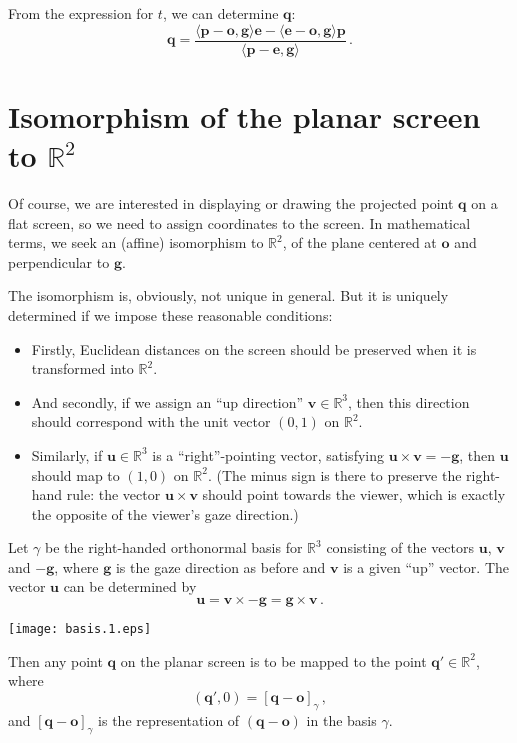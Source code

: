 \documentclass[12pt]{article}
\newcommand{\real}{\mathbb{R}}
\providecommand{\pe}{\mathbf{e}}
\providecommand{\vg}{\mathbf{g}}
\providecommand{\vu}{\mathbf{u}}
\providecommand{\vv}{\mathbf{v}}
\providecommand{\po}{\mathbf{o}}
\providecommand{\pp}{\mathbf{p}}
\providecommand{\pq}{\mathbf{q}}
\begin{document}
From the expression for $t$, we can determine $\pq$:
\begin{equation}
\label{eq:projection}
\pq = \frac{
\langle \pp - \po, \vg \rangle \pe
-\langle \pe - \po, \vg \rangle \pp  
}
{\langle \pp - \pe, \vg \rangle}\,.
\end{equation}

\section{Isomorphism of the planar screen to $\real^2$}

Of course, we are interested in displaying or drawing the projected point $\pq$
on a flat screen, so we need to assign coordinates to the screen.
In mathematical terms, we seek an (affine) isomorphism to $\real^2$,
of the plane centered at $\po$ and perpendicular to $\vg$.

The isomorphism is, obviously, not unique in general.
But it is uniquely determined if we impose these reasonable conditions:
\begin{itemize}
\item
Firstly, Euclidean distances on the screen should be preserved
when it is transformed into $\real^2$.
\item
And secondly, if we assign an ``up direction'' $\vv \in \real^3$,
then this direction should correspond with the 
unit vector $(0, 1)$ on $\real^2$.
\item
Similarly, if $\vu \in \real^3$ is a ``right''-pointing vector,
satisfying
$\vu \times \vv = -\vg$,
then $\vu$ should map to $(1, 0)$ on $\real^2$.
(The minus sign is there to preserve the right-hand rule:
the vector $\vu \times \vv$ should point towards the viewer,
which is exactly the opposite of the viewer's gaze direction.)
\end{itemize}

Let $\gamma$ be the right-handed orthonormal basis for $\real^3$
consisting of
the vectors $\vu$, $\vv$ and $-\vg$,
where $\vg$ is the gaze direction as before and $\vv$ is a given 
``up'' vector.  The vector $\vu$ can be determined by
\[
\vu = \vv \times -\vg = \vg \times \vv\,.
\]
\begin{center}
\texttt{[image: basis.1.eps]}
\end{center}

Then any point $\pq$ on the planar screen is to be mapped to the 
point $\pq' \in \real^2$, where
\begin{equation}
\label{eq:isomorphism}
(\pq', 0) = [\pq - \po]_\gamma\,,
\end{equation}
and $[\pq - \po]_\gamma$ is the representation of $(\pq - \po)$ 
in the basis $\gamma$.
\end{document}
